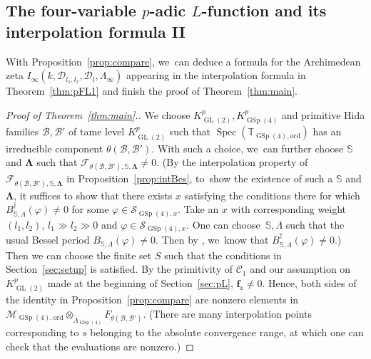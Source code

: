 \documentclass[10pt]{amsart}
\let\Subsection\subsection
\newcommand{\Lfunction}{$L$\nobreakdash-func\-tion\xspace}
\theoremstyle{plain}
\theoremstyle{remark}
\newcommand{\bS}{\mathbb{S}}
\newcommand{\bT}{\mathbb{T}}
\newcommand{\bbc}{\mathbb{c}}
\newcommand{\cD}{\mathcal{D}}
\newcommand{\cF}{\mathcal{F}}
\newcommand{\cM}{\mathcal{M}}
\newcommand{\sB}{\mathscr{B}}
\newcommand{\sC}{\mathscr{C}}
\newcommand{\sS}{\mathscr{S}}
\DeclareMathOperator{\GL}{GL}
\DeclareMathOperator{\GSp}{GSp}
\newcommand{\ord}{\mathrm{ord}}
\DeclareMathOperator{\Spec}{Spec}
\let\wt\widetilde
\newcommand{\bLam}{\boldsymbol\Lambda}
\begin{document}
\Subsection{The four-variable \texorpdfstring{$p$-adic \protect\Lfunction}{pL} and its interpolation formula II}
With Proposition~\ref{prop:compare}, we~can deduce a formula for the Archimedean zeta $I_\infty(k,\cD_{l_1,l_2},\cD_l,\Lambda_\infty)$ appearing in the interpolation formula in Theorem~\ref{thm:pFL1} and finish the proof of Theorem~\ref{thm:main}.

\begin{proof}[Proof of Theorem~\ref{thm:main}.]
We choose $K^p_{\GL(2)},K^p_{\GSp(4)}$ and primitive Hida families $\sB,\sB'$ of tame level $K^p_{\GL(2)}$ such that $\Spec(\bT_{\GSp(4),\ord})$ has an irreducible component $\theta(\sB,\sB')$. With such a choice, we~can further choose $\bS$ and $\bLam$ such that $\cF_{\theta(\sB,\sB'),\bS,\bLam}\neq 0$. (By the interpolation property of $\cF_{\theta(\sB,\sB'),\bS,\bLam}$ in Proposition~\ref{prop:intBes}, to~show the existence of such a $\bS$ and $\bLam$, it suffices to show that there exists $x$ satisfying the conditions there for which $B^\dagger_{\bS,\Lambda}(\varphi)\neq 0$ for some $\varphi\in \sS_{\GSp(4),x}$. Take an $x$ with corresponding weight $(l_1,l_2)$, $l_1\gg l_2\gg 0$ and $\varphi\in \sS_{\GSp(4),x}$. One can choose~$\bS,\Lambda$ such that the usual Bessel period $B_{\bS,\Lambda}(\varphi)\neq 0$. Then by \cite[Prop.\,2.7.1]{pFL}, we~know that $B^\dagger_{\bS,\Lambda}(\varphi)\neq 0$.) Then we can choose the finite set $S$ such that the conditions in Section~\ref{sec:setup} is satisfied. By the primitivity of $\sC_1$ and our assumption on $K^p_{\GL(2)}$ made at the beginning of Section~\ref{sec:pL}, $\bm{f}_\bbc\neq 0$. Hence, both sides of the identity in Proposition~\ref{prop:compare} are nonzero elements in $\cM_{\GSp(4),\ord}\otimes_{\wt{\Lambda}_{\GSp(4)}} F_{\theta(\sB,\sB')}$. (There are many interpolation points corresponding to $s$ belonging to the absolute convergence range, at which one can check that the evaluations are nonzero.)


\end{proof}
\end{document}
